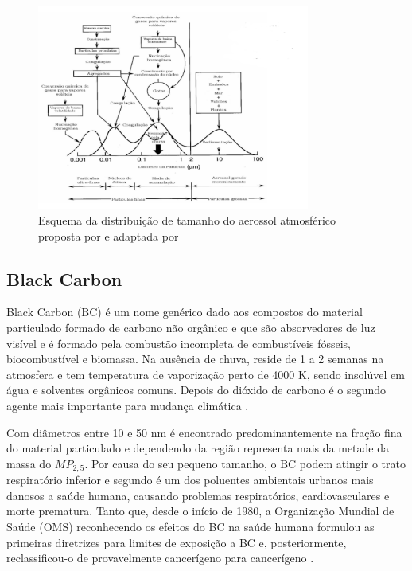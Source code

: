 \newpage
\begin{figure}[H]
  \centering
  \includegraphics[width=0.8\textwidth]{../inputs/images/modas_aerossol.png}
  \caption{Esquema da distribuição de tamanho do aerossol atmosférico proposta
           por \citet{finlayson1999} e adaptada por \citet{oliveira2007} 
           \label{fig:modas_aerossol}}
\end{figure}

\subsection{Black Carbon}

Black Carbon (BC) é um nome genérico dado aos compostos do material particulado 
formado de carbono não orgânico e que são absorvedores de luz visível e é 
formado pela combustão incompleta de combustíveis fósseis, biocombustível e 
biomassa. Na ausência de chuva, reside de 1 a 2 semanas na atmosfera e tem 
temperatura de vaporização perto de 4000 K, sendo insolúvel em água e solventes 
orgânicos comuns. Depois do dióxido de carbono é o segundo agente mais 
importante para mudança climática \citep{bond2013}.

Com diâmetros entre 10 e 50 nm é encontrado predominantemente na fração fina do 
material particulado e dependendo da região representa mais da metade 
da massa do $MP_{2,5}$. Por causa do seu pequeno tamanho, o BC podem atingir o 
trato respiratório inferior e segundo \citet{jacobson2014} é um dos poluentes
ambientais urbanos mais danosos a saúde humana, causando problemas 
respiratórios, cardiovasculares e morte prematura. Tanto que, desde o início 
de 1980, a Organização Mundial de Saúde (OMS) reconhecendo os efeitos do BC na 
saúde humana formulou as primeiras diretrizes para limites de exposição a BC e, 
posteriormente, reclassificou-o de provavelmente cancerígeno para cancerígeno 
\citep{scovronick2015}. 


